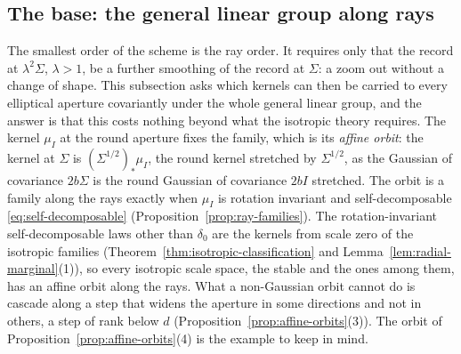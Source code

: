 
\subsection{The base: the general linear group along rays}\label{sec:affine-orbits}

The smallest order of the scheme is the ray order. It requires only that the record at
$\lambda^2\Sigma$, $\lambda > 1$, be a further smoothing of the record at $\Sigma$: a zoom out without
a change of shape. This subsection asks which kernels can then be carried to every elliptical aperture
covariantly under the whole general linear group, and the answer is that this costs nothing beyond
what the isotropic theory requires. The kernel $\mu_I$ at the round aperture fixes the family, which is
its \emph{affine orbit}: the kernel at $\Sigma$ is $(\Sigma^{1/2})_*\mu_I$, the round kernel stretched
by $\Sigma^{1/2}$, as the Gaussian of covariance $2b\Sigma$ is the round Gaussian of covariance $2bI$
stretched. The orbit is a family along the rays exactly when $\mu_I$ is rotation invariant and
self-decomposable \ref{eq:self-decomposable} (Proposition~\ref{prop:ray-families}). The
rotation-invariant self-decomposable laws other than $\delta_0$ are the kernels from scale zero of the
isotropic families (Theorem~\ref{thm:isotropic-classification} and
Lemma~\ref{lem:radial-marginal}(1)), so every isotropic scale space, the stable and the \Matern{} ones
among them, has an affine orbit along the rays. What a non-Gaussian orbit cannot do is cascade along a
step that widens the aperture in some directions and not in others, a step of rank below $d$
(Proposition~\ref{prop:affine-orbits}(3)). The \Matern{} orbit of
Proposition~\ref{prop:affine-orbits}(4) is the example to keep in mind.

